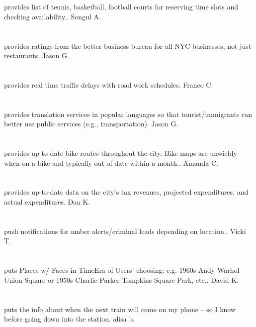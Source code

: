 \section{}provides list of tennis,  basketball,  football courts for reserving time slots and checking availability.. Songul A.
\section{}provides ratings from the better business bureau for all NYC businesses,  not just restaurants. Jason G.
\section{}provides real time traffic delays with road work schedules. Franco C.
\section{}provides translation services in popular languages so that tourist/immigrants can better use public services (e.g.,  transportation). Jason G.
\section{}provides up to date bike routes throughout the city.  Bike maps are unwieldy when on a bike and typically out of date within a month.. Amanda C.
\section{}provides up-to-date data on the city's tax revenues,  projected expenditures,  and actual expenditures. Dan K.
\section{}push notifications for amber alerts/criminal leads depending on location.. Vicki T.
\section{}puts Places w/ Faces in TimeEra of Users' choosing: e.g. 1960s Andy Warhol Union Square or 1950s Charlie Parker Tompkins Square Park,  etc.. David K.
\section{}puts the info about when the next train will come on my phone -- so I know before going down into the station. alisa b.
